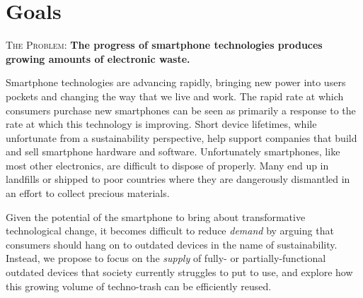
\section{Goals}
\vspace*{-0.05in}
\begin{framed}
\textsc{The Problem:} \textbf{The progress of smartphone technologies
produces growing amounts of electronic waste.}
\end{framed}
\vspace*{-0.2in}

Smartphone technologies are advancing rapidly, bringing new power into users
pockets and changing the way that we live and work. The rapid rate at which
consumers purchase new smartphones can be seen as primarily a response to the
rate at which this technology is improving. Short device lifetimes, while
unfortunate from a sustainability perspective, help support companies that
build and sell smartphone hardware and software. Unfortunately smartphones,
like most other electronics, are difficult to dispose of properly. Many end
up in landfills or shipped to poor countries where they are dangerously
dismantled in an effort to collect precious materials.

Given the potential of the smartphone to bring about transformative
technological change, it becomes difficult to reduce \textit{demand} by
arguing that consumers should hang on to outdated devices in the name of
sustainability. Instead, we propose to focus on the \textit{supply} of fully-
or partially-functional outdated devices that society currently struggles to
put to use, and explore how this growing volume of techno-trash can be
efficiently reused.

